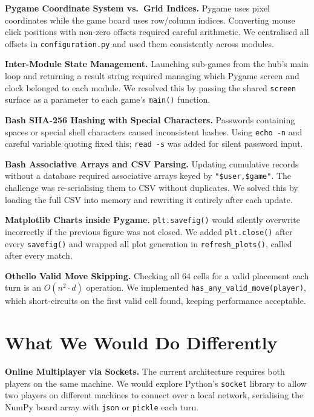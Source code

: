 \documentclass[12pt,a4paper]{article}
\begin{document}
\textbf{Pygame Coordinate System vs.\ Grid Indices.} Pygame uses pixel coordinates while the game board uses row/column indices. Converting mouse click positions with non-zero offsets required careful arithmetic. We centralised all offsets in \texttt{configuration.py} and used them consistently across modules.

\textbf{Inter-Module State Management.} Launching sub-games from the hub's main loop and returning a result string required managing which Pygame screen and clock belonged to each module. We resolved this by passing the shared \texttt{screen} surface as a parameter to each game's \texttt{main()} function.

\textbf{Bash SHA-256 Hashing with Special Characters.} Passwords containing spaces or special shell characters caused inconsistent hashes. Using \texttt{echo -n} and careful variable quoting fixed this; \texttt{read -s} was added for silent password input.

\textbf{Bash Associative Arrays and CSV Parsing.} Updating cumulative records without a database required associative arrays keyed by \texttt{"\$user,\$game"}. The challenge was re-serialising them to CSV without duplicates. We solved this by loading the full CSV into memory and rewriting it entirely after each update.

\textbf{Matplotlib Charts inside Pygame.} \texttt{plt.savefig()} would silently overwrite incorrectly if the previous figure was not closed. We added \texttt{plt.close()} after every \texttt{savefig()} and wrapped all plot generation in \texttt{refresh\_plots()}, called after every match.

\textbf{Othello Valid Move Skipping.} Checking all 64 cells for a valid placement each turn is an $O(n^2 \cdot d)$ operation. We implemented \texttt{has\_any\_valid\_move(player)}, which short-circuits on the first valid cell found, keeping performance acceptable.

\newpage

\section{What We Would Do Differently}

\textbf{Online Multiplayer via Sockets.} The current architecture requires both players on the same machine. We would explore Python's \texttt{socket} library to allow two players on different machines to connect over a local network, serialising the NumPy board array with \texttt{json} or \texttt{pickle} each turn.
\end{document}
